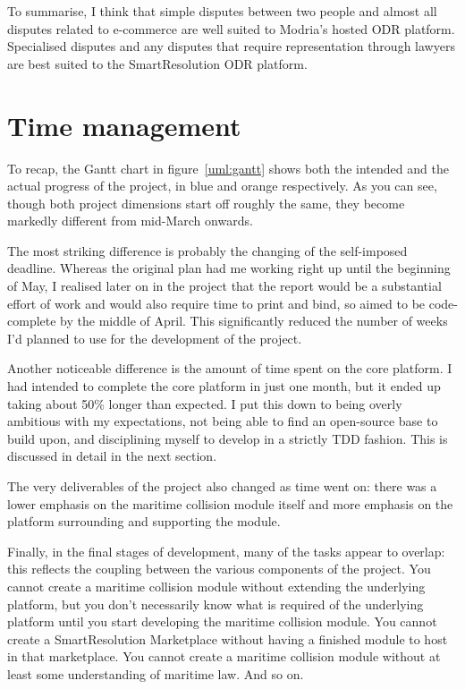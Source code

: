 To summarise, I think that simple disputes between two people and almost all disputes related to e-commerce are well suited to Modria's hosted ODR platform. Specialised disputes and any disputes that require representation through lawyers are best suited to the SmartResolution ODR platform.

\section{Time management}\label{section:timeManagement}

To recap, the Gantt chart in figure~\ref{uml:gantt} shows both the intended and the actual progress of the project, in blue and orange respectively. As you can see, though both project dimensions start off roughly the same, they become markedly different from mid-March onwards.

The most striking difference is probably the changing of the self-imposed deadline. Whereas the original plan had me working right up until the beginning of May, I realised later on in the project that the report would be a substantial effort of work and would also require time to print and bind, so aimed to be code-complete by the middle of April. This significantly reduced the number of weeks I'd planned to use for the development of the project.

Another noticeable difference is the amount of time spent on the core platform. I had intended to complete the core platform in just one month, but it ended up taking about 50\% longer than expected. I put this down to being overly ambitious with my expectations, not being able to find an open-source base to build upon, and disciplining myself to develop in a strictly TDD fashion. This is discussed in detail in the next section.

The very deliverables of the project also changed as time went on: there was a lower emphasis on the maritime collision module itself and more emphasis on the platform surrounding and supporting the module.

Finally, in the final stages of development, many of the tasks appear to overlap: this reflects the coupling between the various components of the project. You cannot create a maritime collision module without extending the underlying platform, but you don't necessarily know what is required of the underlying platform until you start developing the maritime collision module. You cannot create a SmartResolution Marketplace without having a finished module to host in that marketplace. You cannot create a maritime collision module without at least some understanding of maritime law. And so on.

